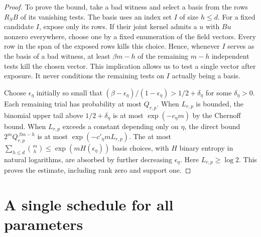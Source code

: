 \documentclass[11pt,letterpaper]{article}
\numberwithin{equation}{section}
\begin{document}
\begin{proof}

To prove the bound, take a bad witness and select a basis from the rows $R_S B$ of its
vanishing tests. The basis uses an index set $I$ of size $h\le d$. For a fixed candidate $I$,
expose only its rows. If their joint kernel admits a $u$ with $Bu$ nonzero everywhere, choose
one by a fixed enumeration of the field vectors. Every row in the span of the exposed rows
kills this choice. Hence, whenever $I$ serves as the basis of a bad witness, at least $\beta
m-h$ of the remaining $m-h$ independent tests kill the chosen vector. This implication allows
us to test a single vector after exposure. It never conditions the remaining tests on $I$
actually being a basis.

Choose $\epsilon_\eta$ initially so small that
$(\beta-\epsilon_\eta)/(1-\epsilon_\eta)>1/2+\delta_\eta$ for some $\delta_\eta>0$. Each
remaining trial has probability at most $Q_{r,p}$. When $L_{r,p}$ is bounded, the binomial
upper tail above $1/2+\delta_\eta$ is at most $\exp(-c_\eta m)$ by the Chernoff bound. When
$L_{r,p}$ exceeds a constant depending only on $\eta$, the direct bound $2^m Q_{r,p}^{\,\beta
m-h}$ is at most $\exp(-c'_\eta m L_{r,p})$. The at most $\sum_{h\le d}\binom mh\le\exp(m
H(\epsilon_\eta))$ basis choices, with $H$ binary entropy in natural logarithms, are absorbed
by further decreasing $\epsilon_\eta$. Here $L_{r,p}\ge\log2$. This proves the estimate,
including rank zero and support one.
\end{proof}

\section{A single schedule for all parameters}\label{sec:prefix}
\end{document}
